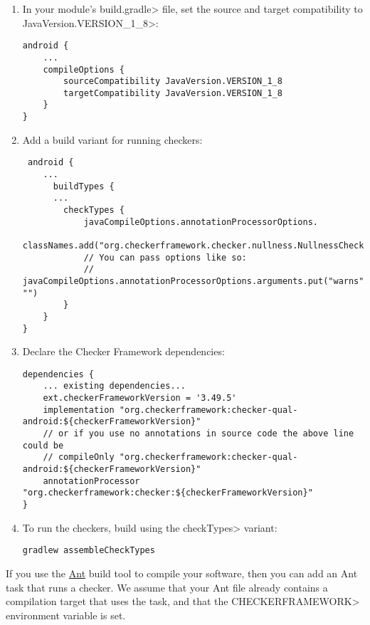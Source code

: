 \begin{enumerate}

\item In your module's \<build.gradle> file, set the source and target
  compatibility to \<JavaVersion.VERSION\_1\_8>:

\begin{Verbatim}
android {
    ...
    compileOptions {
        sourceCompatibility JavaVersion.VERSION_1_8
        targetCompatibility JavaVersion.VERSION_1_8
    }
}
\end{Verbatim}

\item Add a build variant for running checkers:

 \begin{Verbatim}
 android {
    ...
      buildTypes {
      ...
        checkTypes {
            javaCompileOptions.annotationProcessorOptions.
                    classNames.add("org.checkerframework.checker.nullness.NullnessChecker")
            // You can pass options like so:
            // javaCompileOptions.annotationProcessorOptions.arguments.put("warns", "")
        }
    }
}
\end{Verbatim}

\item Declare the Checker Framework dependencies:

\begin{mysmall}
\begin{Verbatim}
dependencies {
    ... existing dependencies...
    ext.checkerFrameworkVersion = '3.49.5'
    implementation "org.checkerframework:checker-qual-android:${checkerFrameworkVersion}"
    // or if you use no annotations in source code the above line could be
    // compileOnly "org.checkerframework:checker-qual-android:${checkerFrameworkVersion}"
    annotationProcessor "org.checkerframework:checker:${checkerFrameworkVersion}"
}
\end{Verbatim}
\end{mysmall}

\item To run the checkers, build using the \<checkTypes> variant:
\begin{Verbatim}
gradlew assembleCheckTypes
\end{Verbatim}

\end{enumerate}



If you use the \href{https://ant.apache.org/}{Ant} build tool to compile
your software, then you can add an Ant task that runs a checker.  We assume
that your Ant file already contains a compilation target that uses the
 task, and that the \<CHECKERFRAMEWORK> environment variable is set.

